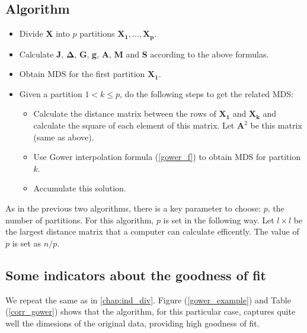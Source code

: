 \documentclass[11pt]{report}
\begin{document}
\subsection{Algorithm}

\begin{itemize}
\item Divide \textbf{X} into $p$ partitions $\mathbf{X_1},\dots, \mathbf{X_p}$.

\item Calculate \textbf{J}, $\mathbf{\Delta}$, \textbf{G}, \textbf{g},
\textbf{A}, \textbf{M} and \textbf{S} according to the above formulas.

\item Obtain MDS for the first partition $\mathbf{X_1}$. 

\item Given a partition $1 < k \leq p$, do the following steps to get the 
related MDS:

\begin{itemize}

\item Calculate the distance matrix between the rows of $\mathbf{X_1}$ and
$\mathbf{X_k}$ and calculate the square of each element of this matrix. Let
$\mathbf{A}^2$ be this matrix (same as above).

\item Use Gower interpolation formula (\ref{gower_f}) to obtain MDS for 
partition $k$. 

\item Accumulate this solution.


\end{itemize}

\end{itemize}


As in the previous two algorithms, there is a key parameter to choose: $p$,
the number of partitions. For this algorithm, $p$ is set in the following way.
Let $l \times l$ be the largest distance matrix that a computer can calculate 
efficently. The value of $p$ is set as $n/p$.


\subsection{Some indicators about the goodness of fit}
We repeat the same as in \autoref{chap:ind_div}. Figure (\ref{gower_example}) 
and Table (\ref{corr_gower}) shows that the algorithm, for this particular case, 
captures quite well the dimesions of the original data, providing high 
goodness of fit.
\end{document}
